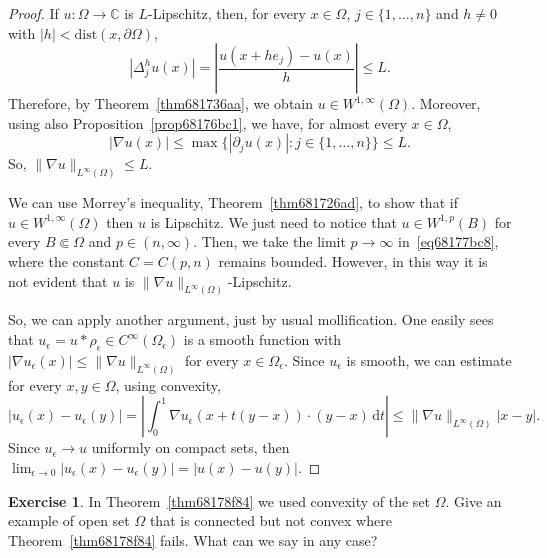 \documentclass[a4paper,9pt]{amsart}
\newcommand{\C}{\mathbb{C}}	%
\newcommand{\did}{\,\mathrm{d}}	%
\newcommand{\de}{\partial}		%
\newcommand{\THEN}{\Rightarrow}	%
\newcommand{\dist}{\mathrm{dist}}
\newcommand{\grad}{\nabla}
\theoremstyle{plain}
\theoremstyle{definition}
\newtheorem{exercise}[proposition]{Exercise}%
\theoremstyle{remark}
\begin{document}
\begin{proof}
	\framebox{$\ref{thm68178f84_1}\THEN\ref{thm68178f84_2}$.}
	If $u:\Omega\to\C$ is $L$-Lipschitz, then, for every $x\in\Omega$, $j\in\{1,\dots,n\}$ and $h\neq0$ with $|h|<\dist(x,\de\Omega)$,
	\begin{equation}
		|\Delta_j^hu(x)|
		= \left| \frac{u(x+he_j)-u(x)}{h} \right| 
		\le L .
	\end{equation}
	Therefore, by Theorem~\ref{thm681736aa}, we obtain $u\in W^{1,\infty}(\Omega)$.
	Moreover, using also Proposition~\ref{prop68176bc1}, we have, for almost every $x\in\Omega$,
	\begin{equation}
		|\grad u(x)|
		\le \max\{|\de_ju(x)|:j\in\{1,\dots,n\}\}
		\le L .
	\end{equation}
	So, $\|\grad u\|_{L^\infty(\Omega)}\le L$.
	
	\framebox{$\ref{thm68178f84_2}\THEN\ref{thm68178f84_1}$.}
	We can use Morrey's inequality, Theorem~\ref{thm681726ad}, to show that if $u\in W^{1,\infty}(\Omega)$ then $u$ is Lipschitz.
	We just need to notice that $u\in W^{1,p}(B)$ for every $B\Subset\Omega$ and $p\in(n,\infty)$.
	Then, we take the limit $p\to\infty$ in~\eqref{eq68177bc8}, where the constant $C=C(p,n)$ remains bounded.
	However, in this way it is not evident that $u$ is $\|\grad u\|_{L^\infty(\Omega)}$-Lipschitz.
	
	So, we can apply another argument, just by usual mollification.
	One easily sees that $u_\epsilon = u*\rho_\epsilon\in C^\infty(\Omega_\epsilon)$
	is a smooth function with $|\grad u_\epsilon(x)|\le \|\grad u\|_{L^\infty(\Omega)}$
	for every $x\in \Omega_\epsilon$.
	Since $u_\epsilon$ is smooth, we can estimate for every $x,y\in\Omega$, using convexity,
	\begin{equation}
		|u_\epsilon(x)-u_\epsilon(y)|
		= \left| \int_0^1 \grad u_\epsilon(x+t(y-x))\cdot (y-x) \did t\right|
		\le \|\grad u\|_{L^\infty(\Omega)} |x-y| .
	\end{equation}
	Since $u_\epsilon\to u$ uniformly on compact sets, then $\lim_{\epsilon\to0}|u_\epsilon(x)-u_\epsilon(y)| = |u(x)-u(y)|$.
\end{proof}

\begin{exercise}
	In Theorem~\ref{thm68178f84} we used convexity of the set $\Omega$.
	Give an example of open set $\Omega$ that is connected but not convex where Theorem~\ref{thm68178f84} fails.
	What can we say in any case?
\end{exercise}
\end{document}
